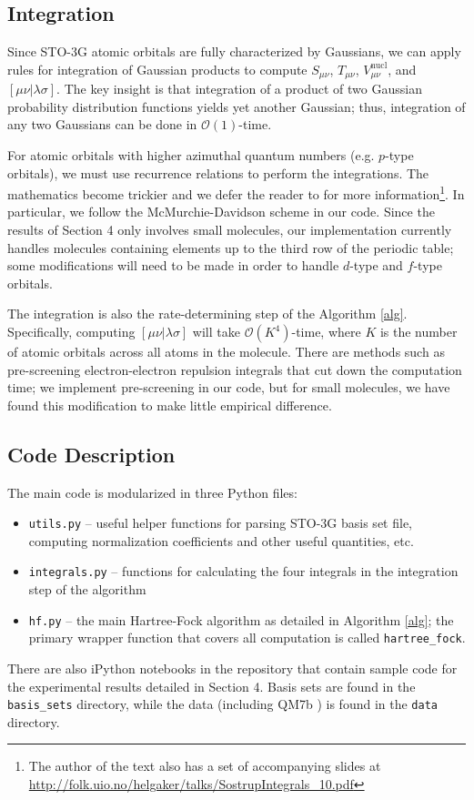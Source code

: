 \documentclass[12pt]{article}
\newcommand{\Oh}{\mathcal{O}}
\begin{document}
\subsection{Integration} 

Since STO-3G atomic orbitals are fully characterized by Gaussians, we can apply rules for integration of Gaussian products to compute $S_{\mu \nu}$, $T_{\mu \nu}$, $V_{\mu \nu}^\text{nucl}$, and $[\mu \nu | \lambda \sigma]$.  The key insight is that integration of a product of two Gaussian probability distribution functions yields yet another Gaussian; thus, integration of any two Gaussians can be done in $\Oh(1)$-time.

For atomic orbitals with higher azimuthal quantum numbers (e.g. $p$-type orbitals), we must use recurrence relations to perform the integrations.  The mathematics become trickier and we defer the reader to \cite{helgaker2014molecular} for more information\footnote{The author of the text also has a set of accompanying slides at \url{http://folk.uio.no/helgaker/talks/SostrupIntegrals_10.pdf}}.  In particular, we follow the McMurchie-Davidson scheme in our code.  Since the results of Section 4 only involves small molecules, our implementation currently handles molecules containing elements up to the third row of the periodic table; some modifications will need to be made in order to handle $d$-type and $f$-type orbitals.         

The integration is also the rate-determining step of the Algorithm \ref{alg}.  Specifically, computing $[\mu \nu | \lambda \sigma]$ will take $\Oh(K^4)$-time, where $K$ is the number of atomic orbitals across all atoms in the molecule.  There are methods such as pre-screening electron-electron repulsion integrals \cite{helgaker2014molecular} that cut down the computation time; we implement pre-screening in our code, but for small molecules, we have found this modification to make little empirical difference.

\subsection{Code Description}

The main code is modularized in three Python files:  
\begin{itemize}
\item \texttt{utils.py} -- useful helper functions for parsing STO-3G basis set file, computing normalization coefficients and other useful quantities, etc.
\item \texttt{integrals.py} -- functions for calculating the four integrals in the integration step of the algorithm 
\item \texttt{hf.py} -- the main Hartree-Fock algorithm as detailed in Algorithm \ref{alg}; the primary wrapper function that covers all computation is called \texttt{hartree\_fock}.   
\end{itemize}              
There are also iPython notebooks in the repository that contain sample code for the experimental results detailed in Section 4.  Basis sets are found in the \texttt{basis\_sets} directory, while the data (including QM7b \cite{montavon2013}) is found in the \texttt{data} directory.      
\end{document}

